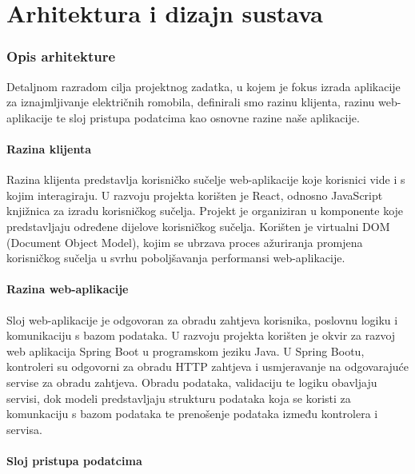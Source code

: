 \chapter{Arhitektura i dizajn sustava}

\subsection{Opis arhitekture}

Detaljnom razradom cilja projektnog zadatka, u kojem je fokus izrada aplikacije za iznajmljivanje električnih romobila, definirali smo razinu klijenta, razinu web-aplikacije te sloj pristupa podatcima kao osnovne razine naše aplikacije.
\newline
\subsubsection{Razina klijenta}

Razina klijenta predstavlja korisničko sučelje web-aplikacije koje korisnici vide i s kojim interagiraju. U razvoju projekta korišten je React, odnosno JavaScript knjižnica za izradu korisničkog sučelja. Projekt je organiziran u komponente koje predstavljaju određene dijelove korisničkog sučelja. Korišten je virtualni DOM (Document Object Model), kojim se ubrzava proces ažuriranja promjena korisničkog sučelja u svrhu poboljšavanja performansi web-aplikacije.
\newline
\subsubsection{Razina web-aplikacije}

Sloj web-aplikacije je odgovoran za obradu zahtjeva korisnika, poslovnu logiku i komunikaciju s bazom podataka. U razvoju projekta korišten je okvir za razvoj web aplikacija Spring Boot u programskom jeziku Java. U Spring Bootu, kontroleri su odgovorni za obradu HTTP zahtjeva i usmjeravanje na odgovarajuće servise za obradu zahtjeva. Obradu podataka, validaciju te logiku obavljaju servisi, dok modeli predstavljaju strukturu podataka koja se koristi za komunkaciju s bazom podataka te prenošenje podataka između kontrolera i servisa.
\newline

\subsubsection{Sloj pristupa podatcima}

